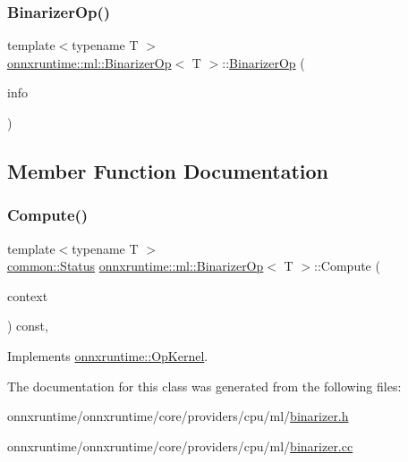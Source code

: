 \subsubsection{\texorpdfstring{Binarizer\+Op()}{BinarizerOp()}}
{\footnotesize\ttfamily template$<$typename T $>$ \\
\mbox{\hyperlink{classonnxruntime_1_1ml_1_1BinarizerOp}{onnxruntime\+::ml\+::\+Binarizer\+Op}}$<$ T $>$\+::\mbox{\hyperlink{classonnxruntime_1_1ml_1_1BinarizerOp}{Binarizer\+Op}} (\begin{DoxyParamCaption}\item[{const \mbox{\hyperlink{classonnxruntime_1_1OpKernelInfo}{Op\+Kernel\+Info}} \&}]{info }\end{DoxyParamCaption})\hspace{0.3cm}{\ttfamily [explicit]}}



\subsection{Member Function Documentation}
\mbox{\label{classonnxruntime_1_1ml_1_1BinarizerOp_a8f77e3debad55252f404e0b390017ae4}} 
\subsubsection{\texorpdfstring{Compute()}{Compute()}}
{\footnotesize\ttfamily template$<$typename T $>$ \\
\mbox{\hyperlink{classonnxruntime_1_1common_1_1Status}{common\+::\+Status}} \mbox{\hyperlink{classonnxruntime_1_1ml_1_1BinarizerOp}{onnxruntime\+::ml\+::\+Binarizer\+Op}}$<$ T $>$\+::Compute (\begin{DoxyParamCaption}\item[{\mbox{\hyperlink{classonnxruntime_1_1OpKernelContext}{Op\+Kernel\+Context}} $\ast$}]{context }\end{DoxyParamCaption}) const\hspace{0.3cm}{\ttfamily [override]}, {\ttfamily [virtual]}}



Implements \mbox{\hyperlink{classonnxruntime_1_1OpKernel_a9eca8656a78b1b3ab9d3351a12798650}{onnxruntime\+::\+Op\+Kernel}}.



The documentation for this class was generated from the following files\+:\begin{DoxyCompactItemize}
\item 
onnxruntime/onnxruntime/core/providers/cpu/ml/\mbox{\hyperlink{binarizer_8h}{binarizer.\+h}}\item 
onnxruntime/onnxruntime/core/providers/cpu/ml/\mbox{\hyperlink{binarizer_8cc}{binarizer.\+cc}}\end{DoxyCompactItemize}
